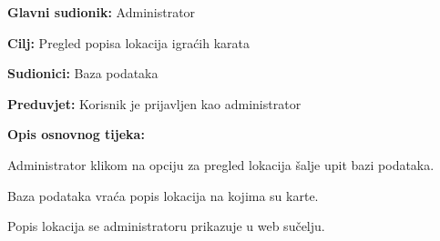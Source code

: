 				\noindent {}
				\begin{packed_item}
					
					\item \textbf{Glavni sudionik: }Administrator
					\item  \textbf{Cilj:} Pregled popisa lokacija igraćih karata
					\item  \textbf{Sudionici:} Baza podataka
					\item  \textbf{Preduvjet:} Korisnik je prijavljen kao administrator
					\item  \textbf{Opis osnovnog tijeka:}
					
					\item[] \begin{packed_enum}
						
						\item Administrator klikom na opciju za pregled lokacija šalje upit bazi podataka.
						\item Baza podataka vraća popis lokacija na kojima su karte.
						\item Popis lokacija se administratoru prikazuje u web sučelju.
					\end{packed_enum}
				\end{packed_item}
				
